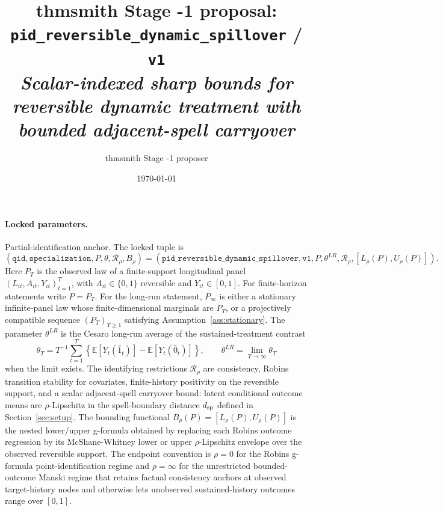 \documentclass[11pt]{article}
\title{thmsmith Stage -1 proposal: \texttt{pid\_reversible\_dynamic\_spillover} / \texttt{v1}%
  \\ \large\textit{Scalar-indexed sharp bounds for reversible dynamic treatment with bounded adjacent-spell carryover}}
\author{thmsmith Stage -1 proposer}
\date{\today}
\newcommand{\E}{\mathbb{E}}
\theoremstyle{definition}
\theoremstyle{plain}
\theoremstyle{remark}
\begin{document}
\maketitle


\paragraph{Locked parameters.}
Partial-identification anchor.  The locked tuple is
\[
(\texttt{qid},\texttt{specialization},P,\theta,\mathcal R_\rho,B_\rho)
=
(\texttt{pid\_reversible\_dynamic\_spillover},\texttt{v1},P,
\theta^{LR},\mathcal R_\rho,[L_\rho(P),U_\rho(P)]).
\]
Here \(P_T\) is the observed law of a finite-support longitudinal panel
\((L_{it},A_{it},Y_{it})_{t=1}^T\), with \(A_{it}\in\{0,1\}\) reversible and
\(Y_{it}\in[0,1]\).  For finite-horizon statements write \(P=P_T\).  For the
long-run statement, \(P_\infty\) is either a stationary infinite-panel law whose
finite-dimensional marginals are \(P_T\), or a projectively compatible sequence
\((P_T)_{T\ge1}\) satisfying Assumption~\ref{ass:stationary}.  The parameter
\(\theta^{LR}\) is the Cesaro long-run average of the sustained-treatment contrast
\[
\theta_T = T^{-1}\sum_{t=1}^T
\left\{\E[Y_t(\bar 1_t)]-\E[Y_t(\bar 0_t)]\right\},
\qquad
\theta^{LR}=\lim_{T\to\infty}\theta_T
\]
when the limit exists.  The identifying restrictions \(\mathcal R_\rho\) are
consistency, Robins transition stability for covariates, finite-history
positivity on the reversible support, and a scalar adjacent-spell carryover
bound: latent conditional outcome means are \(\rho\)-Lipschitz in the
spell-boundary distance \(d_{\rm sp}\) defined in Section~\ref{sec:setup}.
The bounding functional \(B_\rho(P)=[L_\rho(P),U_\rho(P)]\) is the nested
lower/upper g-formula obtained by replacing each Robins outcome regression by
its McShane-Whitney lower or upper \(\rho\)-Lipschitz envelope over the
observed reversible support.  The endpoint convention is
\(\rho=0\) for the Robins g-formula point-identification regime and
\(\rho=\infty\) for the unrestricted bounded-outcome Manski regime that retains
factual consistency anchors at observed target-history nodes and otherwise lets
unobserved sustained-history outcomes range over \([0,1]\).
\end{document}
